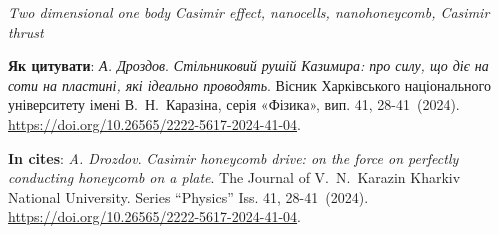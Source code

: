 \documentclass[twoside, 10pt]{article}
\def\myfirstpage{28}
\def\mylastpage{41}
\def\mypages{\myfirstpage-\mylastpage}
\def\myname{A. Drozdov}
\def\mynameukr{А. Дроздов}
\def\mytitle{Casimir honeycomb drive: on the force on perfectly conducting honeycomb on a plate}
\def\mytitleukr{Стільниковий рушій Казимира: про силу, що діє на соти на пластині, які ідеально проводять}
\def\mydoi{10.26565/2222-5617-2024-41-04}
\def\ukrvisnyk{Вісник Харківського національного університету імені В.~Н.~Каразіна, серія «Фізика», вип. 41, \mypages~(2024)}
\def\envisnyk{The Journal of V.~N.~Karazin Kharkiv National University. Series “Physics” Iss. 41, \mypages~(2024)}
\begin{document}

\vspace{5mm}

\noindent
\begin{keywords}
\textit{Two dimensional one body Casimir effect, nanocells, nanohoneycomb, Casimir thrust}
\end{keywords}

\vspace{5mm}

\selectfont

\noindent
\textbf{Як цитувати}: \textit{\mynameukr}. \textit{\mytitleukr}. {\ukrvisnyk}. \href{https://doi.org/\mydoi}{https://doi.org/\mydoi}.

\vspace{5mm}

\selectfont

\noindent
\textbf{In cites}: \textit{\myname}. \textit{\mytitle}. {\envisnyk}. \href{https://doi.org/\mydoi}{https://doi.org/\mydoi}.

\vspace{5mm}

\newpage
\end{document}

